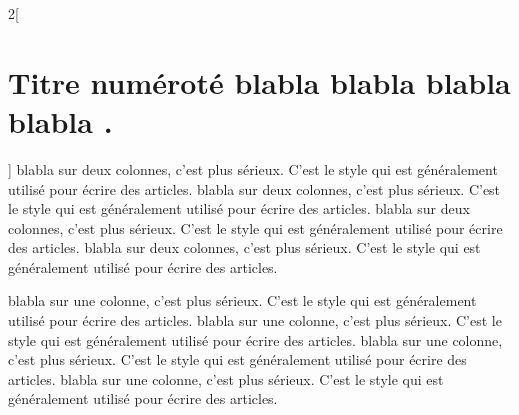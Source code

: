 \documentclass[10pt, a5paper]{report}
\begin{document}
\begin{multicols}{2}[\section{Titre numéroté blabla blabla blabla blabla .}]
   blabla sur deux colonnes, c'est plus sérieux. C'est le
   style qui est généralement utilisé pour écrire des
   articles.
   blabla sur deux colonnes, c'est plus sérieux. C'est le
   style qui est généralement utilisé pour écrire des
   articles.
   blabla sur deux colonnes, c'est plus sérieux. C'est le
   style qui est généralement utilisé pour écrire des
   articles.
   blabla sur deux colonnes, c'est plus sérieux. C'est le
   style qui est généralement utilisé pour écrire des
   articles.
\end{multicols}

   blabla sur une colonne, c'est plus sérieux. C'est le
   style qui est généralement utilisé pour écrire des
   articles.
   blabla sur une colonne, c'est plus sérieux. C'est le
   style qui est généralement utilisé pour écrire des
   articles.
   blabla sur une colonne, c'est plus sérieux. C'est le
   style qui est généralement utilisé pour écrire des
   articles.
   blabla sur une colonne, c'est plus sérieux. C'est le
   style qui est généralement utilisé pour écrire des
   articles.
\end{document}
